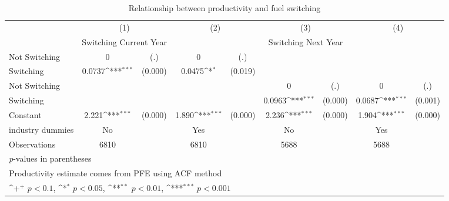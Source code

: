 \begin{table}[htbp]\centering
\def\sym#1{\ifmmode^{#1}\else\(^{#1}\)\fi}
\caption{Relationship between productivity and fuel switching}
\begin{tabular}{l*{4}{cc}}
\toprule
                    &\multicolumn{2}{c}{(1)}           &\multicolumn{2}{c}{(2)}           &\multicolumn{2}{c}{(3)}           &\multicolumn{2}{c}{(4)}           \\
                    &\multicolumn{2}{c}{Switching Current Year}&\multicolumn{2}{c}{ }             &\multicolumn{2}{c}{Switching Next Year}&\multicolumn{2}{c}{ }             \\
\midrule
Not Switching       &           0         &         (.)&           0         &         (.)&                     &            &                     &            \\
Switching           &      0.0737\sym{***}&     (0.000)&      0.0475\sym{*}  &     (0.019)&                     &            &                     &            \\
Not Switching       &                     &            &                     &            &           0         &         (.)&           0         &         (.)\\
Switching           &                     &            &                     &            &      0.0963\sym{***}&     (0.000)&      0.0687\sym{***}&     (0.001)\\
Constant            &       2.221\sym{***}&     (0.000)&       1.890\sym{***}&     (0.000)&       2.236\sym{***}&     (0.000)&       1.904\sym{***}&     (0.000)\\
industry dummies    &          No         &            &         Yes         &            &          No         &            &         Yes         &            \\
\midrule
Observations        &        6810         &            &        6810         &            &        5688         &            &        5688         &            \\
\bottomrule
\multicolumn{9}{l}{\footnotesize \textit{p}-values in parentheses}\\
\multicolumn{9}{l}{\footnotesize Productivity estimate comes from PFE using ACF method}\\
\multicolumn{9}{l}{\footnotesize \sym{+} \(p<0.1\), \sym{*} \(p<0.05\), \sym{**} \(p<0.01\), \sym{***} \(p<0.001\)}\\
\end{tabular}
\end{table}
